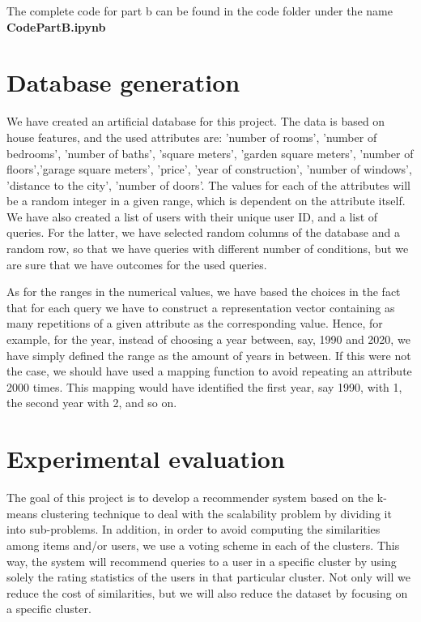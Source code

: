 \documentclass[sigconf]{acmart}
\begin{document}
The complete code for part b can be found in the code folder under the name \textbf{CodePartB.ipynb}

\section{Database generation}
We have created an artificial database for this project. The data is based on house features, and the used attributes are: 'number of rooms', 'number of bedrooms', 'number of baths', 'square meters', 'garden square meters', 'number of floors','garage square meters', 'price', 'year of construction', 'number of windows', 'distance to the city', 'number of doors'. The values for each of the attributes will be a random integer in a given range, which is dependent on the attribute itself. We have also created a list of users with their unique user ID, and a list of queries. For the latter, we have selected random columns of the database and a random row, so that we have queries with different number of conditions, but we are sure that we have outcomes for the used queries.

As for the ranges in the numerical values, we have based the choices in the fact that for each query we have to construct a representation vector containing as many repetitions of a given attribute as the corresponding value. Hence, for example, for the year, instead of choosing a year between, say, 1990 and 2020, we have simply defined the range as the amount of years in between. If this were not the case, we should have used a mapping function to avoid repeating an attribute 2000 times. This mapping would have identified the first year, say 1990, with 1, the second year with 2, and so on.

\section{Experimental evaluation} \label{sec:experiments}
The goal of this project is to develop a recommender system based on the k-means clustering technique to deal with the scalability problem by dividing it into sub-problems. In addition, in order to avoid computing the similarities among items and/or users, we use a voting scheme in each of the clusters. This way, the system will recommend queries to a user in a specific cluster by using solely the rating statistics of the users in that particular cluster. Not only will we reduce the cost of similarities, but we will also reduce the dataset by focusing on a specific cluster.\\
\end{document}
